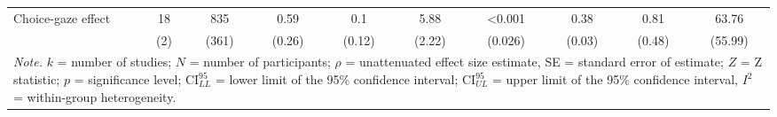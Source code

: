 \begin{table}[ht]
\begin{tabular}{lccccccccc}
  Choice-gaze effect & 18 & 835 & 0.59 & 0.1 & 5.88 & <0.001 & 0.38 & 0.81 & 63.76 \\ 
   & (2) & (361) & (0.26) & (0.12) & (2.22) & (0.026) & (0.03) & (0.48) & (55.99) \\ 
   \hline 
 \multicolumn{10}{p{0.95\textwidth}}{\scriptsize{\textit{Note.} $k$ = number of studies; $N$ = number of participants; $\rho$ = unattenuated effect size estimate, SE = standard error of estimate; $Z$ = Z statistic; $p$ = significance level; $\textrm{CI}^{95}_{LL}$ = lower limit of the 95\% confidence interval; $\textrm{CI}^{95}_{UL}$ = upper limit of the 95\% confidence interval, $I^2$ = within-group heterogeneity.}} 
\end{tabular}
\endgroup
\end{table}
